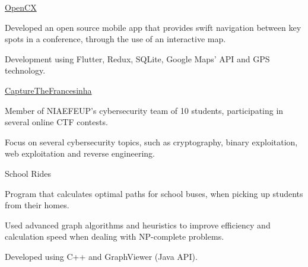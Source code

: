 
\begin{cventries}

  \cventry
    {} %
    {\href{https://github.com/softeng-feup/open-cx}{OpenCX}} %
    {} %
    {} %
    {
      \begin{cvitems} %
      	\item {Developed an open source mobile app that provides swift navigation between key spots in a conference, through the use of an interactive map.}
		    \item {Development using Flutter, Redux, SQLite, Google Maps' API and GPS technology.}
      \end{cvitems}
    }

    \cventry
    {} %
    {\href{https://ctftime.org/team/111459}{CaptureTheFrancesinha}} %
    {} %
    {} %
    {
      \begin{cvitems} %
        \item {Member of NIAEFEUP's cybersecurity team of 10 students, participating in several online CTF contests.}
		    \item {Focus on several cybersecurity topics, such as cryptography, binary exploitation, web exploitation and reverse engineering.}
      \end{cvitems}
    }

  \cventry
    {} %
    {School Rides} %
    {} %
    {} %
    {
      \begin{cvitems} %
      	\item {Program that calculates optimal paths for school buses, when picking up students from their homes.}
		    \item {Used advanced graph algorithms and heuristics to improve efficiency and calculation speed when dealing with NP-complete problems.}
		    \item {Developed using C++ and GraphViewer (Java API).}
      \end{cvitems}
    }

   
\end{cventries}